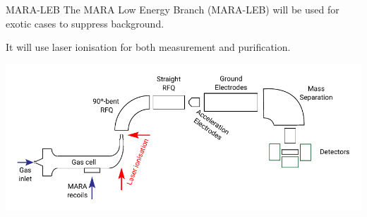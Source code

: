 \documentclass{beamer}
\begin{document}
\begin{frame}{MARA-LEB}
    \vspace{4em}
    The MARA Low Energy Branch (MARA-LEB) will be used for exotic cases to suppress background.

    It will use \alert{laser ionisation} for both measurement and purification.
    
    \begin{center}
        \hspace*{-1em}
        \includegraphics[scale=0.65]{assets/LEB}
    \end{center}
    \end{frame} 
\end{document}
